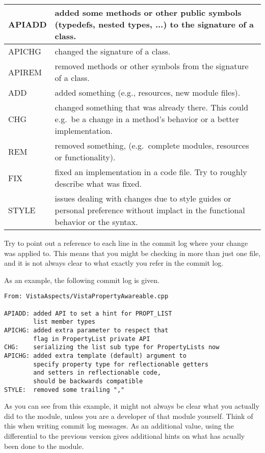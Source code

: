 \begin{tabular}{|l|p{12cm}|}\hline
APIADD   & added some methods or other public symbols (typedefs, nested types, ...) to the signature of a class.\\\hline
APICHG   & changed the signature of a class.\\\hline
APIREM   & removed methods or other symbols from the signature of a class.\\\hline
ADD      & added something (e.g., resources, new module files).\\\hline
CHG      & changed something that was already there.
           This could e.g.\ be a change in a method's behavior or a better implementation.\\\hline
REM      & removed something, (e.g.\ complete modules, resources or functionality).\\\hline
FIX      & fixed an implementation in a code file.
           Try to roughly describe what was fixed.\\\hline
STYLE    & issues dealing with changes due to style guides or personal preference without implact in the functional behavior or the syntax.\\\hline
\end{tabular}

Try to point out a reference to each line in the commit log where your change was applied to.
This means that you might be checking in more than just one file, and it is not always clear to what exactly you refer in the commit log.

As an example, the following commit log is given.
\begin{verbatim}
From: VistaAspects/VistaPropertyAwareable.cpp

APIADD: added API to set a hint for PROPT_LIST 
        list member types
APICHG: added extra parameter to respect that 
        flag in PropertyList private API
CHG:    serializing the list sub type for PropertyLists now
APICHG: added extra template (default) argument to 
        specify property type for reflectionable getters 
        and setters in reflectionable code, 
        should be backwards compatible
STYLE:  removed some trailing ","
\end{verbatim}

As you can see from this example, it might not always be clear what you actually did to the module, unless you are a developer of that module yourself.
Think of this when writing commit log messages.
As an additional value, using the differential to the previous version gives additional hints on what has acually been done to the module.


